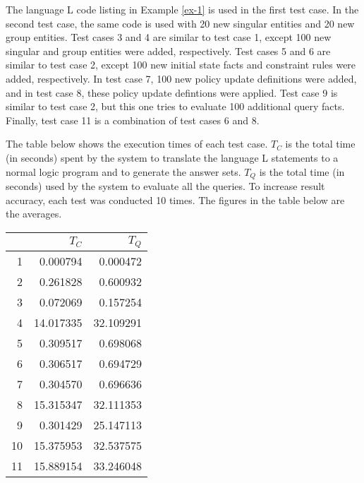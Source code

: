 \documentclass[global,twocolumn,final]{svjour}
\newenvironment{vquote}
  {\begin{list}{}{\leftmargin 1em}\item[]}
  {\end{list}}
\begin{document}
      The language {\cal L} code listing in Example \ref{ex-1} is used in the
      first test case. In the second test case, the same code is used with 20
      new singular entities and 20 new group entities. Test cases 3 and 4 are
      similar to test case 1, except 100 new singular and group entities were
      added, respectively. Test cases 5 and 6 are similar to test case 2,
      except 100 new initial state facts and constraint rules were added,
      respectively. In test case 7, 100 new policy update definitions were
      added, and in test case 8, these policy update defintions were applied.
      Test case 9 is similar to test case 2, but this one tries to evaluate 100
      additional query facts. Finally, test case 11 is a combination of test
      cases 6 and 8.

      The table below shows the execution times of each test case. $T_{C}$ is
      the total time (in seconds) spent by the system to translate the language
      {\cal L} statements to a normal logic program and to generate the answer
      sets. $T_{Q}$ is the total time (in seconds) used by the system to
      evaluate all the queries. To increase result accuracy, each test was
      conducted 10 times. The figures in the table below are the averages.
      
      \begin{vquote}
        \begin{tabular}[t]{|r|r|r|}
          \hline 
          &
          \textbf{$T_{C}$} &
          \textbf{$T_{Q}$} \\
          \hline 
          1 & 0.000794 & 0.000472 \\
          \hline 
          2 & 0.261828  & 0.600932 \\
          \hline 
          3 & 0.072069 & 0.157254 \\
          \hline 
          4 & 14.017335 & 32.109291 \\
          \hline 
          5 & 0.309517 & 0.698068 \\
          \hline 
          6 & 0.306517 & 0.694729 \\
          \hline 
          7 & 0.304570 & 0.696636 \\
          \hline 
          8 & 15.315347 & 32.111353 \\ 
          \hline 
          9 & 0.301429 & 25.147113 \\
          \hline 
          10 & 15.375953 & 32.537575 \\
          \hline 
          11 & 15.889154 & 33.246048 \\
          \hline 

        \end{tabular}
      \end{vquote}
\end{document}
